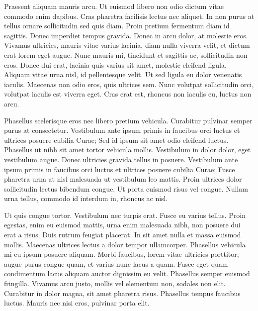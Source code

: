 Praesent aliquam mauris arcu. Ut euismod libero non odio dictum vitae commodo enim dapibus. Cras pharetra facilisis lectus nec aliquet. In non purus at tellus ornare sollicitudin sed quis diam. Proin pretium fermentum diam id sagittis. Donec imperdiet tempus gravida. Donec in arcu dolor, at molestie eros. Vivamus ultricies, mauris vitae varius lacinia, diam nulla viverra velit, et dictum erat lorem eget augue. Nunc mauris mi, tincidunt et sagittis ac, sollicitudin non eros. Donec dui erat, lacinia quis varius sit amet, molestie eleifend ligula. Aliquam vitae urna nisl, id pellentesque velit. Ut sed ligula eu dolor venenatis iaculis. Maecenas non odio eros, quis ultrices sem. Nunc volutpat sollicitudin orci, volutpat iaculis est viverra eget. Cras erat est, rhoncus non iaculis eu, luctus non arcu.

Phasellus scelerisque eros nec libero pretium vehicula. Curabitur pulvinar semper purus at consectetur. Vestibulum ante ipsum primis in faucibus orci luctus et ultrices posuere cubilia Curae; Sed id ipsum sit amet odio eleifend luctus. Phasellus ut nibh sit amet tortor vehicula mollis. Vestibulum in dolor dolor, eget vestibulum augue. Donec ultricies gravida tellus in posuere. Vestibulum ante ipsum primis in faucibus orci luctus et ultrices posuere cubilia Curae; Fusce pharetra urna at nisl malesuada ut vestibulum leo mattis. Proin ultrices dolor sollicitudin lectus bibendum congue. Ut porta euismod risus vel congue. Nullam urna tellus, commodo id interdum in, rhoncus ac nisl.

Ut quis congue tortor. Vestibulum nec turpis erat. Fusce eu varius tellus. Proin egestas, enim eu euismod mattis, urna enim malesuada nibh, non posuere dui erat a risus. Duis rutrum feugiat placerat. In sit amet nulla et massa euismod mollis. Maecenas ultrices lectus a dolor tempor ullamcorper. Phasellus vehicula mi eu ipsum posuere aliquam. Morbi faucibus, lorem vitae ultricies porttitor, augue purus congue quam, et varius nunc lacus a quam. Fusce eget quam condimentum lacus aliquam auctor dignissim eu velit. Phasellus semper euismod fringilla. Vivamus arcu justo, mollis vel elementum non, sodales non elit. Curabitur in dolor magna, sit amet pharetra risus. Phasellus tempus faucibus luctus. Mauris nec nisi eros, pulvinar porta elit.

